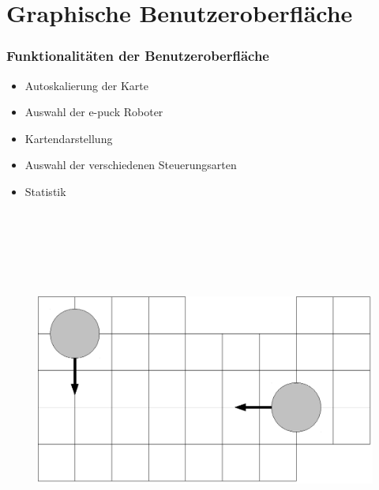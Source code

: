 \documentclass{beamer}
\begin{document}
\section{Graphische Benutzeroberfläche}
\begin{frame}
  \frametitle{Funktionalitäten der Benutzeroberfläche}
  	\begin{itemize}
		\item Autoskalierung der Karte
		\item Auswahl der e-puck Roboter
		\item Kartendarstellung
		\item Auswahl der verschiedenen Steuerungsarten
		\item Statistik
	\end{itemize}  
	\vspace{1cm}
	\begin{figure}[bp]
		\includegraphics[height=12cm]{karte.eps} 
	\end{figure}
\end{frame}
\end{document}
